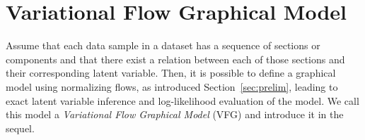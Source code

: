 \documentclass[twoside]{article}
\begin{document}
\vspace{-0.1in}
\section{Variational Flow Graphical Model}\label{sec:main}

Assume that each data sample in a dataset has a sequence of sections or components and that there exist a relation between each of those sections and their corresponding latent variable.
Then, it is possible to define a graphical model using normalizing flows, as introduced Section~\ref{sec:prelim}, leading to exact latent variable inference and log-likelihood evaluation of the model. 
We call this model a \textit{Variational Flow Graphical Model} (VFG) and introduce it in the sequel.
\end{document}
